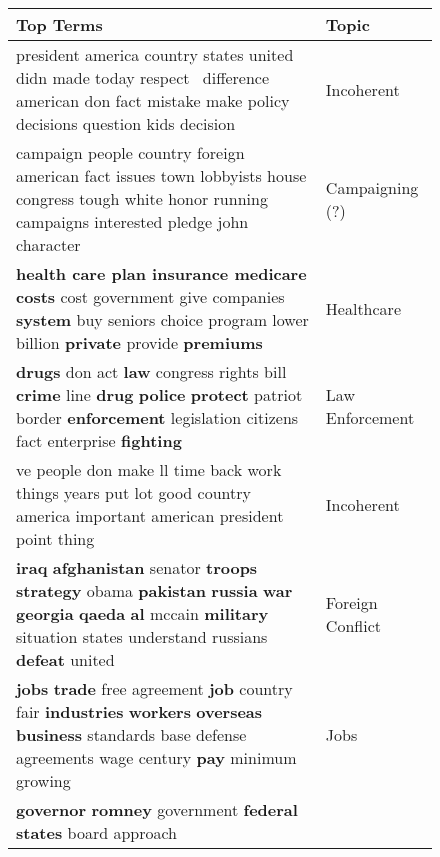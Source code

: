 \begin{figure*}
\begin{flushleft}
\tablefirsthead{}
\tablehead{}
\tabletail{}
\tablelasttail{}
\begin{supertabular}{|m{4.8087597in}|m{1.1906599in}|}
\hline
{ Top Terms} &
{ Topic}\\\hline
{ president america country states united didn made today respect \ difference american don fact
mistake make policy decisions question kids decision} &
{ Incoherent}\\\hline
{ campaign people country foreign american fact issues town lobbyists house congress tough white
honor running campaigns interested pledge john character} &
{ Campaigning (?)}\\\hline
{ \textbf{health care plan insurance medicare costs }cost government give companies
\textbf{system} buy seniors choice program lower billion \textbf{private} provide \textbf{premiums}} &
{ Healthcare}\\\hline
{ \textbf{drugs} don act \textbf{law} congress rights bill \textbf{crime} line \textbf{drug}
\textbf{police} \textbf{protect} patriot border \textbf{enforcement} legislation citizens fact enterprise
\textbf{fighting}} &
{ Law Enforcement}\\\hline
{ ve people don make ll time back work things years put lot good country america important
american president point thing} &
{ Incoherent}\\\hline
{ \textbf{iraq} \textbf{afghanistan} senator \textbf{troops} \textbf{strategy} obama
\textbf{pakistan} \textbf{russia} \textbf{war} \textbf{georgia} \textbf{qaeda} \textbf{al} mccain \textbf{military}
situation states understand russians \textbf{defeat} united} &
{ Foreign Conflict}\\\hline
{ \textbf{jobs} \textbf{trade} free agreement \textbf{job} country fair \textbf{industries}
\textbf{workers} \textbf{overseas} \textbf{business} standards base defense agreements wage century \textbf{pay}
minimum growing} &
{ Jobs}\\\hline
{ \textbf{governor} \textbf{romney} government \textbf{federal} \textbf{states} board approach
}
\end{supertabular}
\end{flushleft}
\end{figure*}
